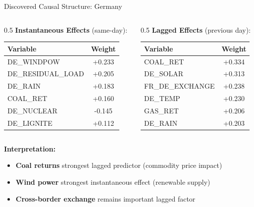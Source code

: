 \documentclass[aspectratio=169]{beamer}
\begin{document}
\begin{frame}{Discovered Causal Structure: Germany}
\begin{columns}
\begin{column}{0.5\textwidth}
\textbf{Instantaneous Effects} (same-day):
\begin{table}
\small
\begin{tabular}{l|c}
\toprule
\textbf{Variable} & \textbf{Weight} \\
\midrule
\textcolor{reprogreen}{DE\_WINDPOW} & +0.233 \\
\textcolor{reprogreen}{DE\_RESIDUAL\_LOAD} & +0.205 \\
\textcolor{reprogreen}{DE\_RAIN} & +0.183 \\
\textcolor{reprogreen}{COAL\_RET} & +0.160 \\
\textcolor{warnred}{DE\_NUCLEAR} & -0.145 \\
DE\_LIGNITE & +0.112 \\
\bottomrule
\end{tabular}
\end{table}
\end{column}

\begin{column}{0.5\textwidth}
\textbf{Lagged Effects} (previous day):
\begin{table}
\small
\begin{tabular}{l|c}
\toprule
\textbf{Variable} & \textbf{Weight} \\
\midrule
\textcolor{reprogreen}{COAL\_RET} & +0.334 \\
\textcolor{reprogreen}{DE\_SOLAR} & +0.313 \\
\textcolor{reprogreen}{FR\_DE\_EXCHANGE} & +0.238 \\
DE\_TEMP & +0.230 \\
GAS\_RET & +0.206 \\
DE\_RAIN & +0.203 \\
\bottomrule
\end{tabular}
\end{table}
\end{column}
\end{columns}

\vspace{0.3cm}
\textbf{Interpretation:}
\begin{itemize}
    \item \textbf{Coal returns} strongest lagged predictor (commodity price impact)
    \item \textbf{Wind power} strongest instantaneous effect (renewable supply)
    \item \textbf{Cross-border exchange} remains important lagged factor
\end{itemize}
\end{frame}
\end{document}
